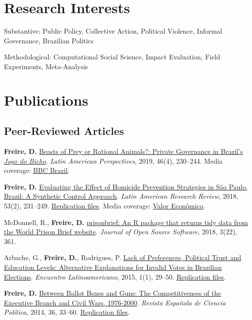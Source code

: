 \documentclass[a4paper]{article}
\renewenvironment{itemize}{
	\begin{list}{}{
			\setlength{\leftmargin}{1.5em}
		}
		}{
	\end{list}
}
\begin{document}
	\section*{Research Interests}

	\begin{itemize}
		\item Substantive: Public Policy, Collective Action, Political Violence, Informal Governance, Brazilian Politics
		\item Methodological: Computational Social Science, Impact Evaluation, Field Experiments, Meta-Analysis  
	\end{itemize}

	\section*{Publications}

	\subsection*{Peer-Reviewed Articles}

	\begin{itemize}
		\item \textbf{Freire, D.} \href{https://doi.org/10.1177/0094582X19846519}{Beasts of Prey or Rational Animals?: Private Governance in Brazil's \emph{Jogo do Bicho}}. \textit{Latin American Perspectives}, 2019, 46(4), 230--244. Media coverage: \href{http://www.bbc.com/portuguese/brasil-40140693}{BBC Brazil}.
		\item \textbf{Freire, D.} \href{https://larrlasa.org/articles/10.25222/larr.334/}{Evaluating the Effect of Homicide Prevention Strategies in São Paulo, Brazil: A Synthetic Control Approach}. \textit{Latin American Research Review}, 2018, 53(2), 231--249. \href{https://github.com/danilofreire/homicides-sp-synth}{Replication files}. Media coverage: \href{http://www.valor.com.br/cultura/5111524/sangue-no-asfalto}{Valor Econômico}.
		\item McDonnell, R., \textbf{Freire, D.} \href{https://doi.org/10.21105/joss.00361}{prisonbrief: An R package that returns tidy data from the World Prison Brief website}. \textit{Journal of Open Source Software}, 2018, 3(22), 361. 
		\item Arbache, G., \textbf{Freire, D.}, Rodrigues, P. \href{http://www.iapss.org/wp-content/uploads/2014/10/ELA1.1_2.Lack-of-Preferences-Political-Trust-and-Education-Levels.pdf}{Lack of Preferences, Political Trust and Education Levels: Alternative Explanations for Invalid Votes in Brazilian Elections}. \textit{Encuentro Latinoamericano}, 2015, 1(1), 29--50. \href{https://github.com/danilofreire/invalid-votes-brazil}{Replication files}.
		\item \textbf{Freire, D.} \href{http://recyt.fecyt.es/index.php/recp/article/view/37638}{Between Ballot Boxes and Guns: The Competitiveness of the Executive Branch and Civil Wars, 1976-2000}. \textit{Revista Española de Ciencia Política}, 2014, 36, 33--60. \href{https://doi.org/10.7910/DVN/NSDUYG}{Replication files}.
	\end{itemize}
\end{document}
